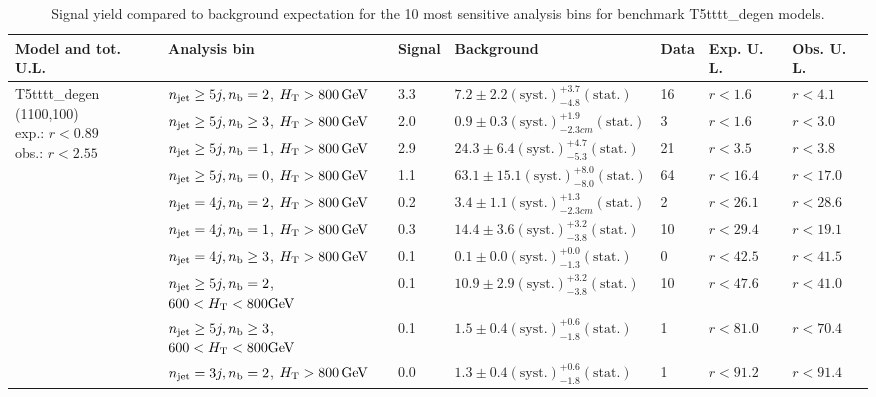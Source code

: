 \begin{table}[h!] 
  \scriptsize
  \caption{ 
Signal yield compared to background expectation for the 10 most sensitive analysis bins 
for benchmark T5tttt\_degen models.
  \label{tab:sigBenchmarksYields_T5tttt_degen}}
  \centering 
  \begin{tabular}{ lllllll } 
    \hline 
    \hline 
    Model and tot. U.L. & Analysis bin & Signal & Background & Data & Exp. U. L. & Obs. U. L. \\ \hline
\multirow{10}{*}{\parbox[t]{2.3cm}{T5tttt\_degen (1100,100)\\exp.: $r<0.89$\\obs.: $r<2.55$}}
 & $n_{\mathrm{jet}} \geq5j,n_{\text{b}} =2$, $\mbox{$H_\text{T}$} > 800 \, \mathrm{GeV}$ & 3.3 & $7.2 \pm 2.2 \mathrm{(syst.)} ^{+3.7}_{-4.8} \mathrm{(stat.)}$ & 16 & $r < 1.6$ & $r < 4.1$\\ 
 & $n_{\mathrm{jet}} \geq5j,n_{\text{b}} \geq3$, $\mbox{$H_\text{T}$} > 800 \, \mathrm{GeV}$ & 2.0 & $0.9 \pm 0.3 \mathrm{(syst.)} ^{+1.9}_{-2.3cm} \mathrm{(stat.)}$ & 3 & $r < 1.6$ & $r < 3.0$\\ 
 & $n_{\mathrm{jet}} \geq5j,n_{\text{b}} =1$, $\mbox{$H_\text{T}$} > 800 \, \mathrm{GeV}$ & 2.9 & $24.3 \pm 6.4 \mathrm{(syst.)} ^{+4.7}_{-5.3} \mathrm{(stat.)}$ & 21 & $r < 3.5$ & $r < 3.8$\\ 
 & $n_{\mathrm{jet}} \geq5j,n_{\text{b}} =0$, $\mbox{$H_\text{T}$} > 800 \, \mathrm{GeV}$ & 1.1 & $63.1 \pm 15.1 \mathrm{(syst.)} ^{+8.0}_{-8.0} \mathrm{(stat.)}$ & 64 & $r < 16.4$ & $r < 17.0$\\ 
 & $n_{\mathrm{jet}} =4j,n_{\text{b}} =2$, $\mbox{$H_\text{T}$} > 800 \, \mathrm{GeV}$ & 0.2 & $3.4 \pm 1.1 \mathrm{(syst.)} ^{+1.3}_{-2.3cm} \mathrm{(stat.)}$ & 2 & $r < 26.1$ & $r < 28.6$\\ 
 & $n_{\mathrm{jet}} =4j,n_{\text{b}} =1$, $\mbox{$H_\text{T}$} > 800 \, \mathrm{GeV}$ & 0.3 & $14.4 \pm 3.6 \mathrm{(syst.)} ^{+3.2}_{-3.8} \mathrm{(stat.)}$ & 10 & $r < 29.4$ & $r < 19.1$\\ 
 & $n_{\mathrm{jet}} =4j,n_{\text{b}} \geq3$, $\mbox{$H_\text{T}$} > 800 \, \mathrm{GeV}$ & 0.1 & $0.1 \pm 0.0 \mathrm{(syst.)} ^{+0.0}_{-1.3} \mathrm{(stat.)}$ & 0 & $r < 42.5$ & $r < 41.5$\\ 
 & $n_{\mathrm{jet}} \geq5j,n_{\text{b}} =2$, $600 < \mbox{$H_\text{T}$} < 800 \mathrm{GeV}$ & 0.1 & $10.9 \pm 2.9 \mathrm{(syst.)} ^{+3.2}_{-3.8} \mathrm{(stat.)}$ & 10 & $r < 47.6$ & $r < 41.0$\\ 
 & $n_{\mathrm{jet}} \geq5j,n_{\text{b}} \geq3$, $600 < \mbox{$H_\text{T}$} < 800 \mathrm{GeV}$ & 0.1 & $1.5 \pm 0.4 \mathrm{(syst.)} ^{+0.6}_{-1.8} \mathrm{(stat.)}$ & 1 & $r < 81.0$ & $r < 70.4$\\ 
 & $n_{\mathrm{jet}} =3j,n_{\text{b}} =2$, $\mbox{$H_\text{T}$} > 800 \, \mathrm{GeV}$ & 0.0 & $1.3 \pm 0.4 \mathrm{(syst.)} ^{+0.6}_{-1.8} \mathrm{(stat.)}$ & 1 & $r < 91.2$ & $r < 91.4$\\ \hline

\end{tabular}
\end{table}
